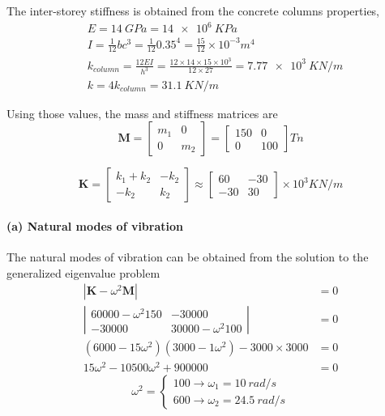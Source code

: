 \begin{Answer}[ref={two_storey}]
The inter-storey stiffness is obtained from the concrete columns properties,
\begin{align*}
&E = \SI{14}{GPa} = \SI{14e6}{KPa} \\
&I = \frac{1}{12}bc^3 = \frac{1}{12}0.35^4 = \frac{15}{12}\times10^{-3}\si{m^4} \\
&k_{column} = \frac{12EI}{h^3} = \frac{12\times14\times15\times10^3}{12\times27} = \SI{7.77e3}{KN/m} \\
&k = 4k_{column} = \SI{31.1}{KN/m}
\end{align*}

Using those values, the mass and stiffness matrices are
$$
\mathbf{M} =
\begin{bmatrix}
    m_1 & 0 \\
    0 & m_2
\end{bmatrix} =
\begin{bmatrix}
    150 & 0 \\
    0 & 100
\end{bmatrix} \si{Tn}
$$

$$
\mathbf{K} =
\begin{bmatrix}
    k_1 + k_2 & -k_2\\
    -k_2 & k_2
\end{bmatrix} \approx
\begin{bmatrix}
    60 & -30 \\
    -30 & 30
\end{bmatrix} \times10^3 \si{KN/m}
$$

\paragraph{(a) Natural modes of vibration}
The natural modes of vibration can be obtained from the solution to the generalized eigenvalue problem
\begin{align*}
|\mathbf{K} - \omega^2 \mathbf{M}| &= 0 \\
\left\vert \begin{matrix}
    60000 -\omega^2 150 & -30000 \\
    -30000 & 30000 -\omega^2 100
\end{matrix} \right\vert &= 0 \\
(6000-15\omega^2)(3000-1\omega^2)-3000\times3000 &= 0 \\
15\omega^2 - 10500\omega^2 + 900000 &= 0
\end{align*}
$$
\omega^2 = \begin{cases}
    100 \rightarrow \omega_1 = \SI{10}{rad/s} \\
    600 \rightarrow \omega_2 = \SI{24.5}{rad/s}
\end{cases}
$$


\end{Answer}
